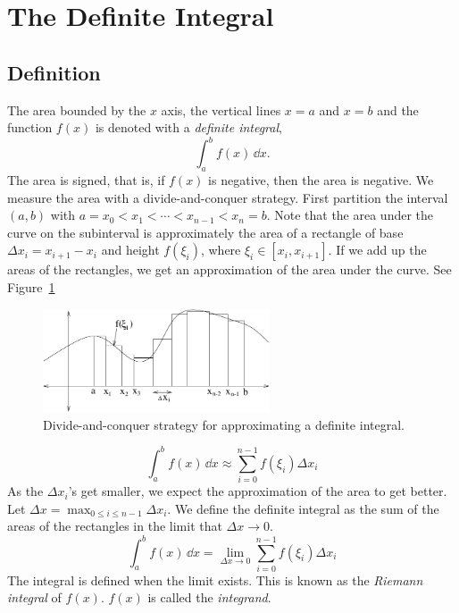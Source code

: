 \section{The Definite Integral}

\subsection{Definition}

The area bounded by the $x$ axis, the vertical lines $x = a$ and $x = b$
and the function $f(x)$ is denoted with a \textit{definite integral}, 
\[
\int_a^b f(x) \,\dd x.
\]
The area is signed, that is, if $f(x)$ is negative, then the area is 
negative.  
We measure the area with a divide-and-conquer strategy.  
First partition the interval $(a,b)$ with
$a = x_0 < x_1 < \cdots < x_{n-1} < x_n = b$.  
Note that the area under the curve on the subinterval is approximately
the area of a rectangle of base $\Delta x_i = x_{i+1} - x_i$ and height
$f(\xi_i)$, where $\xi_i \in [x_i, x_{i+1}]$.  If we add up the areas
of the rectangles, we get an approximation of the area under the 
curve.  See Figure~\ref{intint}

\begin{figure}[h]
  \begin{center}
    \includegraphics[width=0.6\textwidth]{calculus/integral/intint}
  \end{center}
  \caption{Divide-and-conquer strategy for approximating a definite integral.}
  \label{intint}
\end{figure}

\[
\int_a^b f(x) \,\dd x \approx \sum_{i = 0}^{n-1} f(\xi_i) \Delta x_i
\]
As the $\Delta x_i$'s get smaller, we expect the approximation of the
area to get better.  Let $\Delta x = \max_{0 \leq i \leq n-1} \Delta x_i$.
We define the definite integral as the sum of the areas of the rectangles
in the limit that $\Delta x \to 0$.
\[
\int_a^b f(x) \,\dd x 
= \lim_{\Delta x \to 0} \sum_{i = 0}^{n-1} f(\xi_i) \Delta x_i
\]
The integral is defined when the limit exists.  This is known as the
\textit{Riemann integral} of $f(x)$.  $f(x)$ is called the \textit{integrand}.




